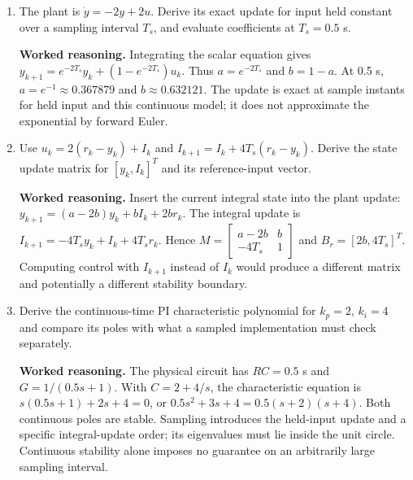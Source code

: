 \documentclass[10pt,a4paper]{article}
\newcommand{\answer}{\par\smallskip\textbf{Worked reasoning.} }
\begin{document}
\begin{enumerate}
\item The plant is $\dot y=-2y+2u$. Derive its exact update for input held constant over a sampling interval $T_s$, and evaluate coefficients at $T_s=0.5$ s.
\answer Integrating the scalar equation gives $y_{k+1}=e^{-2T_s}y_k+(1-e^{-2T_s})u_k$. Thus $a=e^{-2T_s}$ and $b=1-a$. At 0.5 s, $a=e^{-1}\approx0.367879$ and $b\approx0.632121$. The update is exact at sample instants for held input and this continuous model; it does not approximate the exponential by forward Euler.
\item Use $u_k=2(r_k-y_k)+I_k$ and $I_{k+1}=I_k+4T_s(r_k-y_k)$. Derive the state update matrix for $[y_k,I_k]^T$ and its reference-input vector.
\answer Insert the current integral state into the plant update: $y_{k+1}=(a-2b)y_k+bI_k+2br_k$. The integral update is $I_{k+1}=-4T_sy_k+I_k+4T_sr_k$. Hence $M=\begin{bmatrix}a-2b&b\\-4T_s&1\end{bmatrix}$ and $B_r=[2b,4T_s]^T$. Computing control with $I_{k+1}$ instead of $I_k$ would produce a different matrix and potentially a different stability boundary.
\item Derive the continuous-time PI characteristic polynomial for $k_p=2$, $k_i=4$ and compare its poles with what a sampled implementation must check separately.
\answer The physical circuit has $RC=0.5$ s and $G=1/(0.5s+1)$. With $C=2+4/s$, the characteristic equation is $s(0.5s+1)+2s+4=0$, or $0.5s^2+3s+4=0.5(s+2)(s+4)$. Both continuous poles are stable. Sampling introduces the held-input update and a specific integral-update order; its eigenvalues must lie inside the unit circle. Continuous stability alone imposes no guarantee on an arbitrarily large sampling interval.
\end{enumerate}
\end{document}
